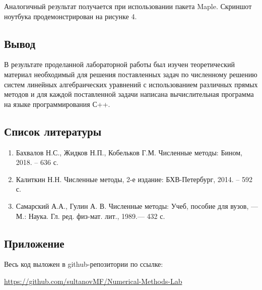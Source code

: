 \documentclass[a4paper, fontsize=14pt]{article}
\begin{document}
Аналогичный результат получается при использовании пакета Maple. Скриншот ноутбука продемонстрирован на рисунке 4.

\newpage
\subsection*{Вывод}
В результате проделанной лабораторной работы был изучен теоретический материал необходимый для решения поставленных задач по численному решению систем линейных алгебраических уравнений с использованием различных прямых методов и для каждой поставленной задачи написана вычислительная программа на языке программирования С++.
\newpage
\subsection*{Список литературы}
\begin{enumerate}
    \item Бахвалов Н.С., Жидков Н.П., Кобельков Г.М. Численные методы: Бином, 2018. – 636 с.
    \item Калиткин Н.Н. Численные методы, 2-е издание: БХВ-Петербург, 2014. – 592 с.
    \item Самарский А.А., Гулин А. В. Численные методы: Учеб, пособие для вузов, — М.: Наука. Гл. ред. физ-мат. лит., 1989.— 432 с.
\end{enumerate}
\newpage


\subsection*{Приложение}
Весь код выложен в github-репозитории по ссылке:

\url{https://github.com/sultanovMF/Numerical-Methods-Lab}
\end{document}
